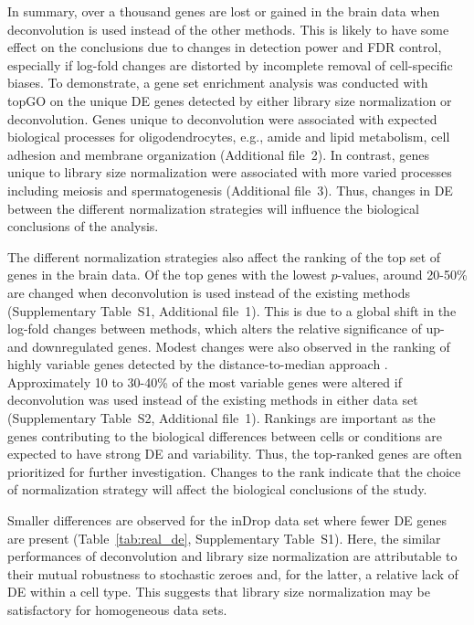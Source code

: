 \documentclass{bmcart}
\newcommand{\supprank}{S1}
\newcommand{\suppHVG}{S2}
\begin{document}
In summary, over a thousand genes are lost or gained in the brain data when deconvolution is used instead of the other methods.
This is likely to have some effect on the conclusions due to changes in detection power and FDR control, 
    especially if log-fold changes are distorted by incomplete removal of cell-specific biases.
To demonstrate, a gene set enrichment analysis was conducted with topGO \cite{alexa2010topgo} on the unique DE genes detected by either library size normalization or deconvolution.
Genes unique to deconvolution were associated with expected biological processes for oligodendrocytes, e.g., amide and lipid metabolism, cell adhesion and membrane organization (Additional file~2).
In contrast, genes unique to library size normalization were associated with more varied processes including meiosis and spermatogenesis (Additional file~3).
Thus, changes in DE between the different normalization strategies will influence the biological conclusions of the analysis.

The different normalization strategies also affect the ranking of the top set of genes in the brain data.
Of the top genes with the lowest $p$-values, around 20-50\% are changed when deconvolution is used instead of the existing methods (Supplementary Table~\supprank{}, Additional file~1).
This is due to a global shift in the log-fold changes between methods, which alters the relative significance of up- and downregulated genes.
Modest changes were also observed in the ranking of highly variable genes detected by the distance-to-median approach \cite{kolod2015single}.
Approximately 10 to 30-40\% of the most variable genes were altered if deconvolution was used instead of the existing methods in either data set (Supplementary Table~\suppHVG{}, Additional file~1).
Rankings are important as the genes contributing to the biological differences between cells or conditions are expected to have strong DE and variability.
Thus, the top-ranked genes are often prioritized for further investigation.
Changes to the rank indicate that the choice of normalization strategy will affect the biological conclusions of the study.

Smaller differences are observed for the inDrop data set where fewer DE genes are present (Table~\ref{tab:real_de}, Supplementary Table~\supprank{}).
Here, the similar performances of deconvolution and library size normalization are attributable to their mutual robustness to stochastic zeroes and, for the latter, a relative lack of DE within a cell type.
This suggests that library size normalization may be satisfactory for homogeneous data sets.
\end{document}
